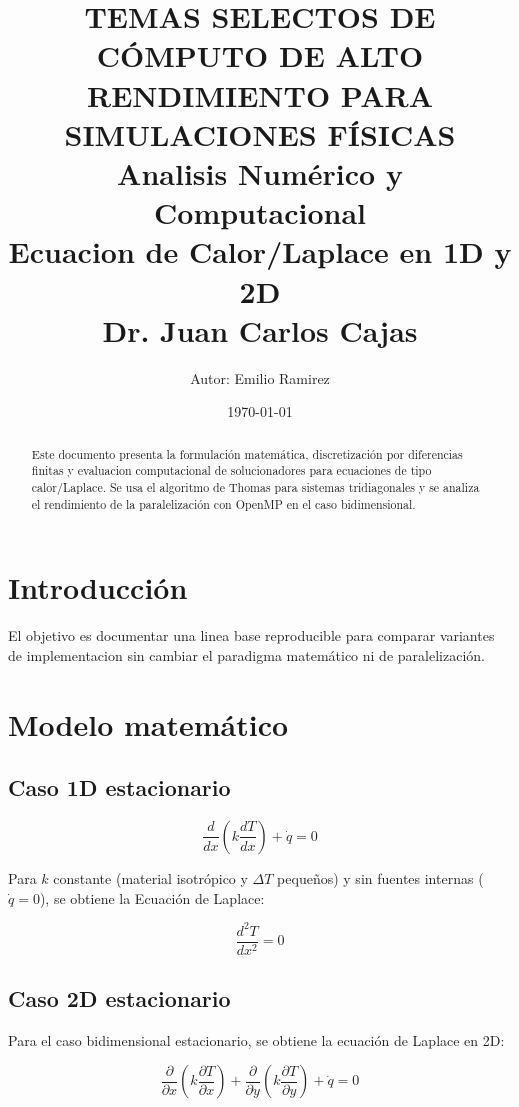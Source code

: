 \documentclass[11pt,a4paper]{article}
\title{TEMAS SELECTOS DE C\'OMPUTO DE ALTO RENDIMIENTO PARA SIMULACIONES F\'ISICAS\\
Analisis Num\'erico y Computacional\\
Ecuacion de Calor/Laplace en 1D y 2D\\
Dr. Juan Carlos Cajas}
\author{Autor: Emilio Ramirez}
\date{\today}
\begin{document}
\maketitle

\begin{abstract}
Este documento presenta la formulaci\'on matem\'atica, discretizaci\'on por diferencias
finitas y evaluacion computacional de solucionadores para ecuaciones de tipo
calor/Laplace. Se usa el algoritmo de Thomas para sistemas tridiagonales y se
analiza el rendimiento de la paralelizaci\'on con OpenMP en el caso bidimensional.
\end{abstract}

\section{Introducci\'on}
El objetivo es documentar una linea base reproducible para comparar variantes de
implementacion sin cambiar el paradigma matem\'atico ni de paralelizaci\'on.

\section{Modelo matem\'atico}
\subsection{Caso 1D estacionario}
\begin{equation}
\frac{d}{dx}\left(k\frac{dT}{dx}\right) + \dot{q} = 0
\end{equation}

Para $k$ constante (material isotr\'opico y $\Delta T$ peque\~nos) 
y sin fuentes internas ($\dot{q}=0$), se obtiene la Ecuaci\'on de Laplace:

\begin{equation}
\frac{d^2T}{dx^2}=0
\end{equation}

\subsection{Caso 2D estacionario}

Para el caso bidimensional estacionario, se obtiene la ecuaci\'on de Laplace en 2D:

\begin{equation}
\frac{\partial}{\partial x}\left(k\frac{\partial T}{\partial x}\right) + \frac{\partial}{\partial y}\left(k\frac{\partial T}{\partial y}\right) + \dot{q} = 0
\end{equation}
\end{document}
